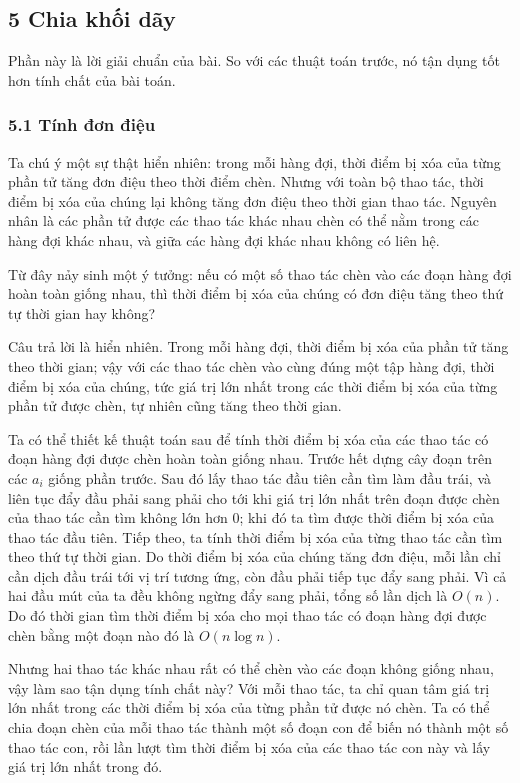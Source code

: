 \documentclass[11pt]{article}
\begin{document}
\subsection*{5 Chia khối dãy}

Phần này là lời giải chuẩn của bài. So với các thuật toán trước, nó tận dụng tốt
hơn tính chất của bài toán.

\subsubsection*{5.1 Tính đơn điệu}

Ta chú ý một sự thật hiển nhiên: trong mỗi hàng đợi, thời điểm bị xóa của từng
phần tử tăng đơn điệu theo thời điểm chèn. Nhưng với toàn bộ thao tác, thời điểm
bị xóa của chúng lại không tăng đơn điệu theo thời gian thao tác. Nguyên nhân là
các phần tử được các thao tác khác nhau chèn có thể nằm trong các hàng đợi khác
nhau, và giữa các hàng đợi khác nhau không có liên hệ.

Từ đây nảy sinh một ý tưởng: nếu có một số thao tác chèn vào các đoạn hàng đợi
hoàn toàn giống nhau, thì thời điểm bị xóa của chúng có đơn điệu tăng theo thứ
tự thời gian hay không?

Câu trả lời là hiển nhiên. Trong mỗi hàng đợi, thời điểm bị xóa của phần tử tăng
theo thời gian; vậy với các thao tác chèn vào cùng đúng một tập hàng đợi, thời
điểm bị xóa của chúng, tức giá trị lớn nhất trong các thời điểm bị xóa của từng
phần tử được chèn, tự nhiên cũng tăng theo thời gian.

Ta có thể thiết kế thuật toán sau để tính thời điểm bị xóa của các thao tác có
đoạn hàng đợi được chèn hoàn toàn giống nhau. Trước hết dựng cây đoạn trên các
\(a_i\) giống phần trước. Sau đó lấy thao tác đầu tiên cần tìm làm đầu trái, và
liên tục đẩy đầu phải sang phải cho tới khi giá trị lớn nhất trên đoạn được chèn
của thao tác cần tìm không lớn hơn 0; khi đó ta tìm được thời điểm bị xóa của
thao tác đầu tiên. Tiếp theo, ta tính thời điểm bị xóa của từng thao tác cần tìm
theo thứ tự thời gian. Do thời điểm bị xóa của chúng tăng đơn điệu, mỗi lần chỉ
cần dịch đầu trái tới vị trí tương ứng, còn đầu phải tiếp tục đẩy sang phải. Vì
cả hai đầu mút của ta đều không ngừng đẩy sang phải, tổng số lần dịch là
\(O(n)\). Do đó thời gian tìm thời điểm bị xóa cho mọi thao tác có đoạn hàng đợi
được chèn bằng một đoạn nào đó là \(O(n\log n)\).

Nhưng hai thao tác khác nhau rất có thể chèn vào các đoạn không giống nhau, vậy
làm sao tận dụng tính chất này? Với mỗi thao tác, ta chỉ quan tâm giá trị lớn
nhất trong các thời điểm bị xóa của từng phần tử được nó chèn. Ta có thể chia
đoạn chèn của mỗi thao tác thành một số đoạn con để biến nó thành một số thao
tác con, rồi lần lượt tìm thời điểm bị xóa của các thao tác con này và lấy giá
trị lớn nhất trong đó.
\end{document}
